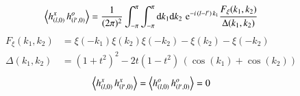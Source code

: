 \begin{grayframe}[frametitle = {Horizontale Graßmann-Korrelationen für das unendliche 2d Ising-Gitter}]
\begin{equation} 
\left\langle h^{x}_{(l,0)}\, h^{o}_{(l', 0)}  \right\rangle = \frac{1}{(2\pi)^2}\int_{-\pi}^{\pi} \int_{-\pi}^{\pi} \mathrm{d} k_1 \mathrm{d} k_2 \,\,\mathrm{e}^{-i\, (l-l') \,k_1} \frac{F_{\xi}(k_1,k_2)}{\Delta(k_1, k_2)}  \label{eq: corr Integral}
\end{equation}
\begin{align}
F_{\xi}(k_1,k_2) &= \xi(-k_1)\xi(k_2)\xi(-k_2) -\xi(k_2) - \xi(-k_2) \\
\Delta(k_1, k_2) &= (1+t^2)^2 - 2t(1-t^2)\,(\cos(k_1) + \cos(k_2))
\end{align}
\begin{equation} \label{eq: hxhx and hoho is null}
\left\langle h^{x}_{(l,0)}\, h^{x}_{(l', 0)}  \right\rangle = 
\left\langle h^{o}_{(l,0)}\, h^{o}_{(l', 0)}  \right\rangle = 0
\end{equation}
\end{grayframe}

